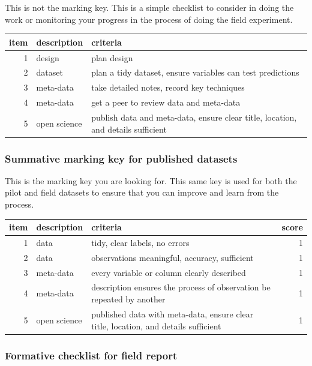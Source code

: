 \documentclass[
]{book}
\begin{document}
This is not the marking key. This is a simple checklist to consider in doing the work or monitoring your progress in the process of doing the field experiment.

\begin{tabular}{rll}
\toprule
item & description & criteria\\
\midrule
1 & design & plan design\\
2 & dataset & plan a tidy dataset, ensure variables can test predictions\\
3 & meta-data & take detailed notes, record key techniques\\
4 & meta-data & get a peer to review data and meta-data\\
5 & open science & publish data and meta-data, ensure clear title, location, and details sufficient\\
\bottomrule
\end{tabular}

\hypertarget{summative-marking-key-for-published-datasets}{%
\subsubsection*{Summative marking key for published datasets}\label{summative-marking-key-for-published-datasets}}

This is the marking key you are looking for. This same key is used for both the pilot and field datasets to ensure that you can improve and learn from the process.

\begin{tabular}{rllr}
\toprule
item & description & criteria & score\\
\midrule
1 & data & tidy, clear labels, no errors & 1\\
2 & data & observations meaningful, accuracy, sufficient & 1\\
3 & meta-data & every variable or column clearly described & 1\\
4 & meta-data & description ensures the process of observation be repeated by another & 1\\
5 & open science & published data with meta-data, ensure clear title, location, and details sufficient & 1\\
\bottomrule
\end{tabular}

\hypertarget{formative-checklist-for-field-report}{%
\subsubsection*{Formative checklist for field report}\label{formative-checklist-for-field-report}}
\end{document}
